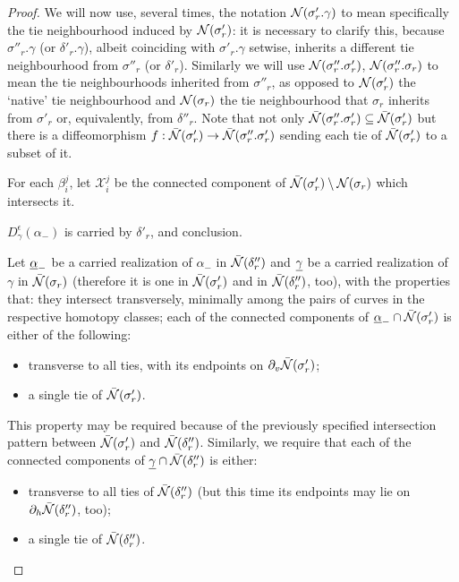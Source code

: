 \begin{proof}
We will now use, several times, the notation ${\mathcal N}(\sigma'_r.\gamma)$ to mean specifically the tie neighbourhood induced by ${\mathcal N}(\sigma'_r)$: it is necessary to clarify this, because $\sigma''_r.\gamma$ (or $\delta'_r.\gamma$), albeit coinciding with $\sigma'_r.\gamma$ setwise, inherits a different tie neighbourhood from $\sigma''_r$ (or $\delta'_r$). Similarly we will use ${\mathcal N}(\sigma''_r.\sigma'_r)$, ${\mathcal N}(\sigma''_r.\sigma_r)$ to mean the tie neighbourhoods inherited from $\sigma''_r$, as opposed to ${\mathcal N}(\sigma'_r)$ the `native' tie neighbourhood and ${\mathcal N}(\sigma_r)$ the tie neighbourhood that $\sigma_r$ inherits from $\sigma'_r$ or, equivalently, from $\delta''_r$. Note that not only $\bar{{\mathcal N}}(\sigma''_r.\sigma'_r)\subseteq \bar{{\mathcal N}}(\sigma'_r)$ but there is a diffeomorphism $f:\bar{{\mathcal N}}(\sigma'_r)\rightarrow \bar{{\mathcal N}}(\sigma''_r.\sigma'_r)$ sending each tie of $\bar{{\mathcal N}}(\sigma'_r)$ to a subset of it.

For each $\beta_i^j$, let $\mathcal X_i^j$ be the connected component of $\bar{{\mathcal N}}(\sigma'_r)\setminus {\mathcal N}(\sigma_r)$ which intersects it. 

 $D_\gamma^\epsilon(\alpha_-)$ is carried by $\delta'_r$, and conclusion.

Let $\underline{\alpha}_-$ be a carried realization of $\alpha_-$ in $\bar{{\mathcal N}}(\delta''_r)$ and $\underline{\gamma}$ be a carried realization of $\gamma$ in $\bar{{\mathcal N}}(\sigma_r)$ (therefore it is one in $\bar{{\mathcal N}}(\sigma'_r)$ and in $\bar{{\mathcal N}}(\delta''_r)$, too), with the properties that: they intersect transversely, minimally among the pairs of curves in the respective homotopy classes; each of the connected components of $\underline{\alpha}_-\cap\bar{{\mathcal N}}(\sigma'_r)$ is either of the following:
\begin{itemize}
\item transverse to all ties, with its endpoints on $\partial_v\bar{{\mathcal N}}(\sigma'_r)$;
\item a single tie of $\bar{{\mathcal N}}(\sigma'_r)$.
\end{itemize}
This property may be required because of the previously specified intersection pattern between $\bar{{\mathcal N}}(\sigma'_r)$ and $\bar{{\mathcal N}}(\delta''_r)$. Similarly, we require that each of the connected components of $\underline{\gamma}\cap\bar{{\mathcal N}}(\delta''_r)$ is either:
\begin{itemize}
\item transverse to all ties of $\bar{{\mathcal N}}(\delta''_r)$ (but this time its endpoints may lie on $\partial_h\bar{{\mathcal N}}(\delta''_r)$, too);
\item a single tie of $\bar{{\mathcal N}}(\delta''_r)$.
\end{itemize}


\end{proof}
